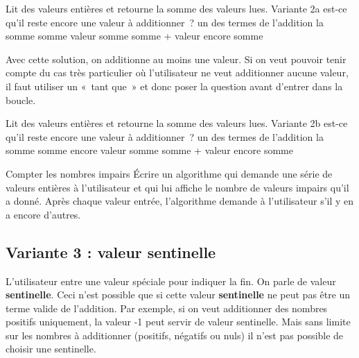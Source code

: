 		\begin{LDA}
		\LComment Lit des valeurs entières et retourne la somme des valeurs lues.
		 \RComment Variante 2a
			 \RComment est-ce qu’il reste encore une valeur à additionner~?
			 \RComment un des termes de l’addition
			 \RComment la somme
			\Let somme 
			\Repeat 
				\Read valeur
				\Let somme \Gets somme + valeur 
				\Read encore
			\Return somme
		\EndAlgo
		\end{LDA}
		
		Avec cette solution, on additionne au moins une valeur. 
		Si on veut pouvoir tenir compte du
		cas très particulier où l’utilisateur ne veut
		additionner aucune valeur, il faut utiliser un «~tant que~» et donc
		poser la question avant d’entrer dans la boucle.

		\begin{LDA}
		\LComment Lit des valeurs entières et retourne la somme des valeurs lues.
		 \RComment Variante 2b
			 \RComment est-ce qu’il reste encore une valeur à additionner~?
			 \RComment un des termes de l’addition
			 \RComment la somme
			\Let somme \Gets 0
			\Read encore
			\While{encore} 
				\Read valeur
				\Let somme \Gets somme + valeur 
				\Read encore
			\EndWhile
			\Return somme
		\EndAlgo
		\end{LDA}

		\begin{Exercice}{Compter les nombres impairs}
			Écrire un algorithme qui demande une série
			de valeurs entières à l'utilisateur
			et qui lui affiche le nombre de valeurs impairs
			qu'il a donné.
			Après chaque valeur entrée,
			l'algorithme demande à l'utilisateur s'il y en a encore d'autres.
		\end{Exercice}

	\subsection{Variante 3 : valeur sentinelle}
		
		L’utilisateur entre une valeur spéciale pour indiquer la fin. 
		On parle de valeur \textbf{sentinelle}. 
		Ceci n’est possible que si cette valeur \textbf{sentinelle} ne peut pas être
		un terme valide de l’addition. Par exemple, si on veut
		additionner des nombres positifs uniquement, la valeur -1 peut servir
		de valeur sentinelle. Mais sans limite sur les nombres à additionner
		(positifs, négatifs ou nuls) il n’est pas possible de
		choisir une sentinelle.

